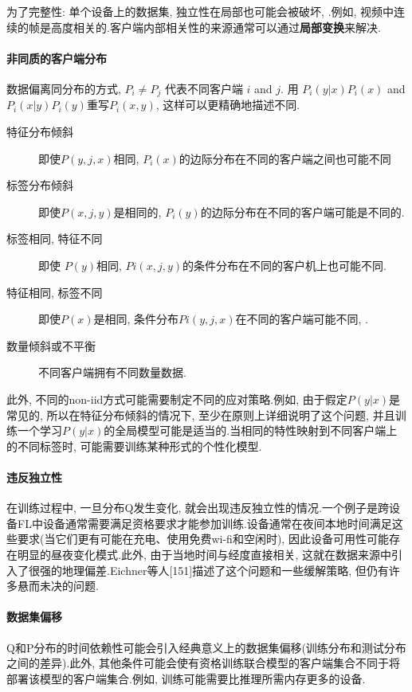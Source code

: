 为了完整性: 单个设备上的数据集,  独立性在局部也可能会被破坏, .例如, 视频中连续的帧是高度相关的.客户端内部相关性的来源通常可以通过\textbf{局部变换}来解决.

\paragraph{非同质的客户端分布}
数据偏离同分布的方式\citep{hsieh2019non},     $P_i \neq P_j$ 代表不同客户端 $i$ and $j$. 用 $P_i(y | x) P_i(x)$ and $P_i(x | y) P_i(y) $重写$P_i(x,  y)$, 这样可以更精确地描述不同.
\begin{description}
    \item[特征分布倾斜] 即使$P(y, j, x)$相同,  $P_i(x)$的边际分布在不同的客户端之间也可能不同
    \item[标签分布倾斜] 即使$P(x,  j,  y)$是相同的, $P_i(y)$的边际分布在不同的客户端可能是不同的.
    \item[标签相同, 特征不同] 即使 $P(y)$相同,  $Pi(x, j, y)$的条件分布在不同的客户机上也可能不同.
    \item[特征相同, 标签不同] 即使$P(x)$是相同,  条件分布$Pi(y, j, x)$在不同的客户端可能不同, .
    \item[数量倾斜或不平衡]不同客户端拥有不同数量数据.
\end{description}

此外, 不同的non-iid方式可能需要制定不同的应对策略.例如, 由于假定$P(y | x)$是常见的, 所以在特征分布倾斜的情况下, 至少在原则上详细说明了这个问题, 并且训练一个学习$P(y | x)$的全局模型可能是适当的.当相同的特性映射到不同客户端上的不同标签时, 可能需要训练某种形式的个性化模型.

\paragraph{违反独立性}
在训练过程中, 一旦分布Q发生变化, 就会出现违反独立性的情况.一个例子是跨设备FL中设备通常需要满足资格要求才能参加训练.设备通常在夜间本地时间满足这些要求(当它们更有可能在充电、使用免费wi-fi和空闲时), 因此设备可用性可能存在明显的昼夜变化模式.此外, 由于当地时间与经度直接相关, 这就在数据来源中引入了很强的地理偏差.Eichner等人[151]描述了这个问题和一些缓解策略, 但仍有许多悬而未决的问题.

\paragraph{数据集偏移}
Q和P分布的时间依赖性可能会引入经典意义上的数据集偏移(训练分布和测试分布之间的差异).此外, 其他条件可能会使有资格训练联合模型的客户端集合不同于将部署该模型的客户端集合.例如, 训练可能需要比推理所需内存更多的设备.


